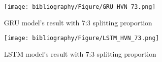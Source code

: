 \documentclass{ieeeojies}
\begin{document}
\begin{figure}[H]
  \centering
  \begin{minipage}{0.8\linewidth}
    \centering
    \texttt{[image: bibliography/Figure/GRU\_HVN\_73.png]}
    \caption{GRU model's result with 7:3 splitting proportion}
    \label{fig8}
  \end{minipage}
\end{figure}

\begin{figure}[H]
  \centering
  \begin{minipage}{0.8\linewidth}
    \centering
    \texttt{[image: bibliography/Figure/LSTM\_HVN\_73.png]}
    \caption{LSTM model's result with 7:3 splitting proportion}
    \label{fig9}
  \end{minipage}
\end{figure}
\end{document}
